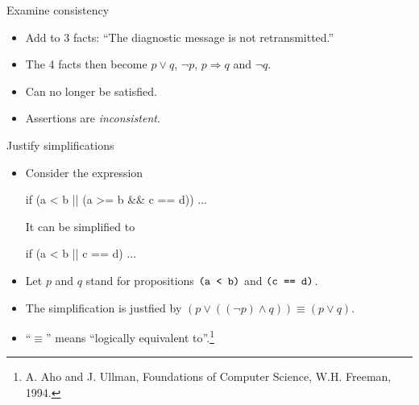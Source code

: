 \documentclass[style=sailor,size=12pt]{powerdot}
\newcommand{\tid}[1]{\mbox{\tt #1}}
\begin{document}
\begin{wideslide}[bm=,toc=]{Examine consistency}
\begin{itemize}
\item Add to 3 facts: ``The diagnostic message is not retransmitted.''
\item The 4 facts then become $p\vee q$, $\neg p$, $p\Rightarrow q$ and $\neg q$.
\item Can no longer be satisfied.
\item Assertions are {\em inconsistent\/}.
\end{itemize}
\end{wideslide}

\begin{wideslide}[bm=,toc=]{Justify simplifications}
\begin{itemize}
\item Consider the expression
\vspace{-1em}
\begin{program}
if (a < b || (a >= b \&\& c == d)) ...
\end{program}
It can be simplified to
\vspace{-1em}
\begin{program}
if (a < b || c == d) ...
\end{program}
\item Let $p$ and $q$ stand for propositions $\tid{(a < b)}$ and $\tid{(c == d)}$.
\item The simplification is justfied by $(p\vee ((\neg p) \wedge q)) \equiv (p\vee q)$.
\item ``$\equiv$'' means ``logically equivalent to''.\footnote{
A. Aho and J. Ullman, Foundations of Computer Science, W.H. Freeman, 1994.}
\end{itemize}
\end{wideslide}
\end{document}
